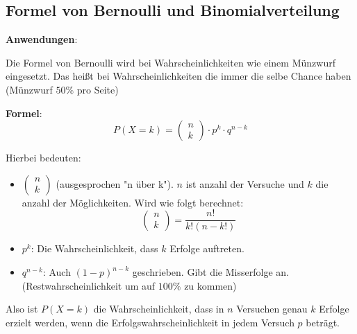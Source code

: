 \subsection{Formel von Bernoulli und Binomialverteilung}
\label{sec:bernoulli}
\textbf{Anwendungen}:

Die Formel von Bernoulli wird bei Wahrscheinlichkeiten wie einem Münzwurf eingesetzt. Das heißt bei Wahrscheinlichkeiten die immer die selbe Chance haben (Münzwurf $50\%$ pro Seite)

\vspace{0.4cm}

\textbf{Formel}:
\[
    P(X = k) = 
    \begin{pmatrix}
        n \\ k
    \end{pmatrix}
    \cdot p^k \cdot q^{n-k}
\]

Hierbei bedeuten:
\begin{itemize}
    \item $
    \begin{pmatrix}
        n \\ k
    \end{pmatrix}
    $
    (ausgesprochen "n über k"). 
    $n$ ist anzahl der Versuche und $k$ die anzahl der Möglichkeiten. Wird wie folgt berechnet: 
    \[
        \begin{pmatrix}
            n \\ k
        \end{pmatrix}
        =
        \frac{n!}{k!(n-k!)}
    \]

    \item $p^k$: Die Wahrscheinlichkeit, dass $k$ Erfolge auftreten.
    \item $q^{n-k}$: Auch $(1-p)^{n-k}$ geschrieben. Gibt die Misserfolge an. (Restwahrscheinlichkeit um auf $100\%$ zu kommen)
\end{itemize}

Also ist $P(X=k)$ die Wahrscheinlichkeit, dass in $n$ Versuchen genau $k$ Erfolge erzielt werden, wenn die Erfolgswahrscheinlichkeit in jedem Versuch $p$ beträgt.
